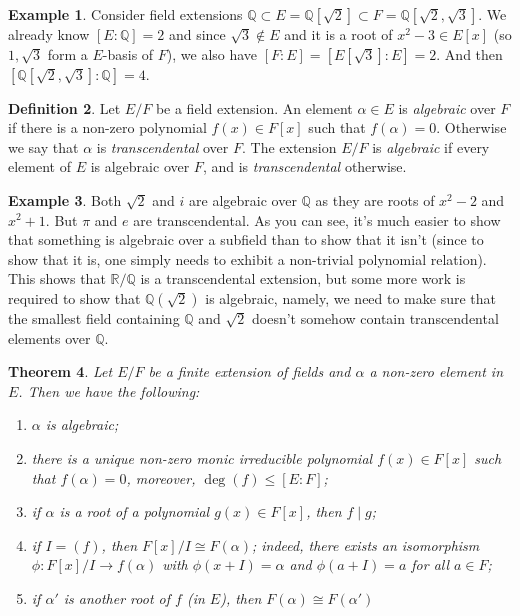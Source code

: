 \documentclass[12pt]{report}
\newtheorem{theorem}{Theorem}[section]
\theoremstyle{definition}
\newtheorem{definition}[theorem]{Definition}
\newtheorem{example}[theorem]{Example}
\newcommand{\QQ}{\mathbb{Q}}
\newcommand{\RR}{\mathbb{R}}
\begin{document}
\begin{example}
	Consider field extensions $\QQ\subset E= \QQ[\sqrt{2}]\subset F=\QQ[\sqrt{2},\sqrt{3}]$. We already know $[E:\QQ]=2$ and since $\sqrt{3}\notin E$ and it is a root of $x^2-3\in E[x]$ (so $1,\sqrt{3}$ form a $E$-basis of $F$), we also have $[F:E]=[E[\sqrt{3}]:E]=2$. And then $[\QQ[\sqrt{2},\sqrt{3}]:\QQ]=4$.
\end{example}

\begin{definition}
	Let $E/F$ be a field extension. An element $\alpha\in E$ is \emph{algebraic} over $F$ if there is a non-zero polynomial $f(x) \in F[x]$ such that $f(\alpha) = 0$. Otherwise we say that $\alpha$ is \emph{transcendental} over $F$. The extension $E/F$ is \emph{algebraic} if every element of $E$ is algebraic over $F$, and is \emph{transcendental} otherwise.
\end{definition}

\begin{example}
	Both $\sqrt{2}$ and $i$ are algebraic over $\QQ$ as they are roots of $x^2-2$ and $x^2+1$.  But $\pi$ and $e$ are transcendental. As you can see, it's much easier to show that something is algebraic over a subfield than to show that it isn't (since to show that it is, one simply needs to exhibit a non-trivial
	polynomial relation). This shows that $\RR/\QQ$ is a transcendental extension, but some more work is required to show that $\QQ(\sqrt{2})$ is algebraic, namely, we need to make sure that the smallest
	field containing $\QQ$ and $\sqrt{2}$ doesn't somehow contain transcendental elements over $\QQ$.
\end{example}

\begin{theorem}\label{minimal}
	Let $E/F$ be a finite extension of fields and $\alpha$ a non-zero element in $E$. Then we have the following:
	\begin{enumerate}
		\item $\alpha$ is algebraic;
		\item there is a unique non-zero monic irreducible polynomial $f(x) \in F[x]$ such that $f(\alpha) = 0$, moreover, $\deg(f)\leq [E:F]$;
		\item if $\alpha$ is a root of a polynomial $g(x)\in F[x]$, then $f\mid g$;
		\item if $I=(f)$, then $F[x]/I \cong F(\alpha)$; indeed, there exists an isomorphism $\phi: F[x]/I \to f(\alpha)$ with $\phi(x+I)=\alpha$ and $\phi(a+I)=a$ for all $a\in F$;
		\item if $\alpha'$ is another root of $f$ (in $E$), then $F(\alpha)\cong F(\alpha')$
	\end{enumerate}
\end{theorem}
\end{document}

